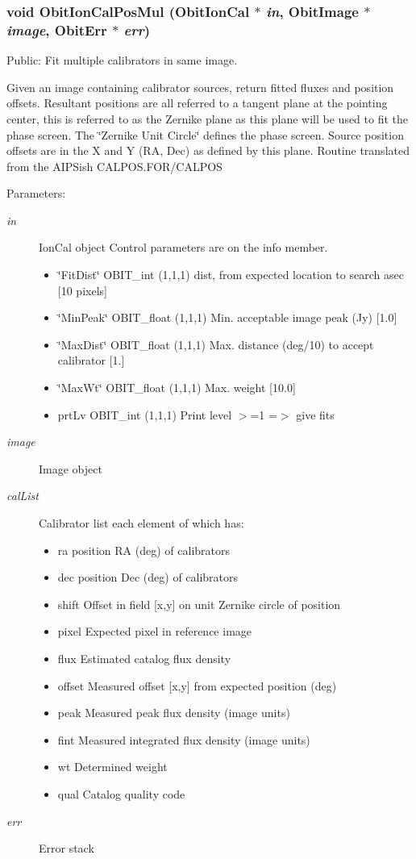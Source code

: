 \subsubsection{\setlength{\rightskip}{0pt plus 5cm}void Obit\-Ion\-Cal\-Pos\-Mul ({\bf Obit\-Ion\-Cal} $\ast$ {\em in}, {\bf Obit\-Image} $\ast$ {\em image}, {\bf Obit\-Err} $\ast$ {\em err})}\label{ObitIonCal_8c_a47}


Public: Fit multiple calibrators in same image. 

Given an image containing calibrator sources, return fitted fluxes and position offsets. Resultant positions are all referred to a tangent plane at the pointing center, this is referred to as the Zernike plane as this plane will be used to fit the phase screen. The \char`\"{}Zernike Unit Circle\char`\"{} defines the phase screen. Source position offsets are in the X and Y (RA, Dec) as defined by this plane. Routine translated from the AIPSish CALPOS.FOR/CALPOS \begin{Desc}
\item[Parameters:]
\begin{description}
\item[{\em in}]Ion\-Cal object Control parameters are on the info member. \begin{itemize}
\item \char`\"{}Fit\-Dist\char`\"{} OBIT\_\-int (1,1,1) dist, from expected location to search asec [10 pixels] \item \char`\"{}Min\-Peak\char`\"{} OBIT\_\-float (1,1,1) Min. acceptable image peak (Jy) [1.0] \item \char`\"{}Max\-Dist\char`\"{} OBIT\_\-float (1,1,1) Max. distance (deg/10) to accept calibrator [1.] \item \char`\"{}Max\-Wt\char`\"{} OBIT\_\-float (1,1,1) Max. weight [10.0] \item prt\-Lv OBIT\_\-int (1,1,1) Print level $>$=1 =$>$ give fits \end{itemize}
\item[{\em image}]Image object \item[{\em cal\-List}]Calibrator list each element of which has: \begin{itemize}
\item ra position RA (deg) of calibrators \item dec position Dec (deg) of calibrators \item shift Offset in field [x,y] on unit Zernike circle of position \item pixel Expected pixel in reference image \item flux Estimated catalog flux density \item offset Measured offset [x,y] from expected position (deg) \item peak Measured peak flux density (image units) \item fint Measured integrated flux density (image units) \item wt Determined weight \item qual Catalog quality code \end{itemize}
\item[{\em err}]Error stack \end{description}
\end{Desc}
